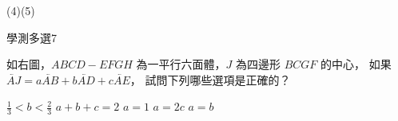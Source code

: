 \begin{QUESTIONS}
\begin{QUESTION}
\begin{QBODY}
        \end{QBODY}
        \begin{QFROMS}
        \end{QFROMS}
        \begin{QTAGS}\end{QTAGS}
        \begin{QANS}
            (4)(5)
        \end{QANS}
        \begin{QSOLLIST}
        \end{QSOLLIST}
        \begin{QEMPTYSPACE}
        \end{QEMPTYSPACE}
    \end{QUESTION}
    \begin{QUESTION}
        \begin{ExamInfo}{92}{學測}{多選}{7}
        \end{ExamInfo}
        \begin{ExamAnsRateInfo}{45}{79}{41}{15}
        \end{ExamAnsRateInfo}
        \begin{QBODY}
            如右圖，$ABCD-EFGH$ 為一平行六面體，$J$ 為四邊形 $BCGF$ 的中心，
            如果 $\lvec{AJ} = a \lvec{AB} + b\lvec{AD}+ c\lvec{AE}$，
            試問下列哪些選項是正確的？ 
            \begin{QOPS} 
                \QOP $\frac{1}{3} < b < \frac{2}{3}$ 
                \QOP $a + b + c = 2$  
                \QOP $a=1$
                \QOP $a=2c$ 
                \QOP $a=b$
            \end{QOPS}
        

\end{QBODY}
\end{QUESTION}
\end{QUESTIONS}
